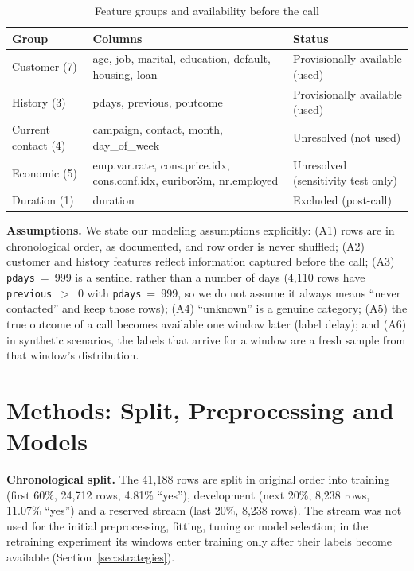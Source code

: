 \documentclass[conference]{IEEEtran}
\begin{document}
\begin{table}[t]
\caption{Feature groups and availability before the call}
\label{tab:features}
\centering
\footnotesize
\begin{tabular}{@{}p{2.3cm}p{3.2cm}p{2.1cm}@{}}
\toprule
Group & Columns & Status \\
\midrule
Customer (7) & age, job, marital, education, default, housing, loan & Provisionally available (used) \\
History (3) & pdays, previous, poutcome & Provisionally available (used) \\
Current contact (4) & campaign, contact, month, day\_of\_week & Unresolved (not used) \\
Economic (5) & emp.var.rate, cons.price.idx, cons.conf.idx, euribor3m, nr.employed & Unresolved (sensitivity test only) \\
Duration (1) & duration & Excluded (post-call) \\
\bottomrule
\end{tabular}
\end{table}

\textbf{Assumptions.} We state our modeling assumptions explicitly: (A1) rows are in chronological order, as documented, and row order is never shuffled; (A2) customer and history features reflect information captured before the call; (A3) \texttt{pdays}~=~999 is a sentinel rather than a number of days (4,110 rows have \texttt{previous}~$>$~0 with \texttt{pdays}~=~999, so we do not assume it always means ``never contacted'' and keep those rows); (A4) ``unknown'' is a genuine category; (A5) the true outcome of a call becomes available one window later (label delay); and (A6) in synthetic scenarios, the labels that arrive for a window are a fresh sample from that window's distribution.

\section{Methods: Split, Preprocessing and Models}
\label{sec:models}

\textbf{Chronological split.} The 41,188 rows are split in original order into training (first 60\%, 24,712 rows, 4.81\% ``yes''), development (next 20\%, 8,238 rows, 11.07\% ``yes'') and a reserved stream (last 20\%, 8,238 rows). The stream was not used for the initial preprocessing, fitting, tuning or model selection; in the retraining experiment its windows enter training only after their labels become available (Section~\ref{sec:strategies}).
\end{document}
